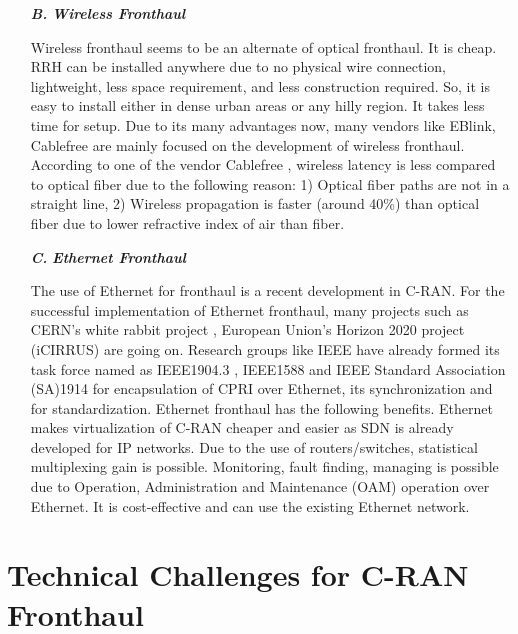\begin{multicols}{2}

\begin{itemize}



\item[{\textit{\textbf{ B.}}}] {\textit{\textbf{Wireless Fronthaul}}}

Wireless fronthaul seems to be an alternate of optical fronthaul. It is cheap. RRH can be \hbox{installed} anywhere due to no physical wire connection, lightweight, less space requirement, and less construction required. So, it is easy to install either in dense urban areas or any hilly region. It takes less time for setup. Due to its many advantages now, many vendors like EBlink, Cablefree are mainly focused on the development of wireless fronthaul. According to one of the vendor Cablefree \cite{art3-key42}, wireless latency is less compared to optical fiber due to the following reason: 1) Optical fiber paths are not in a straight line, 2) Wireless propagation is faster (around 40\%) than optical fiber due to lower refractive index of air than fiber.

\item[{\textit{\textbf{ C.}}}] {\textit{\textbf{Ethernet Fronthaul}}}

The use of Ethernet for fronthaul is a recent development in C-RAN. For the successful implementation of Ethernet fronthaul, many projects such as CERN’s white rabbit project \cite{art3-key44}, European Union’s Horizon 2020 project (iCIRRUS) \cite{art3-key45} are going on. Research groups like IEEE have already formed its task force named as IEEE1904.3 \cite{art3-key46}, IEEE1588 \cite{art3-key47} and IEEE Standard Association (SA)1914 \cite{art3-key48} for encapsulation of CPRI over Ethernet, its synchronization and for standardization. Ethernet fronthaul has the following benefits. Ethernet makes virtualization of C-RAN cheaper and easier as SDN is already developed for IP networks. Due to the use of routers/switches, statistical multiplexing gain is possible. Monitoring, fault finding, managing is possible due to Operation, Administration and Maintenance (OAM) operation over Ethernet. It is cost-effective and can use the existing Ethernet network.
\end{itemize}

\section{Technical Challenges for C-RAN Fronthaul}\label{sect05}


\end{multicols}
